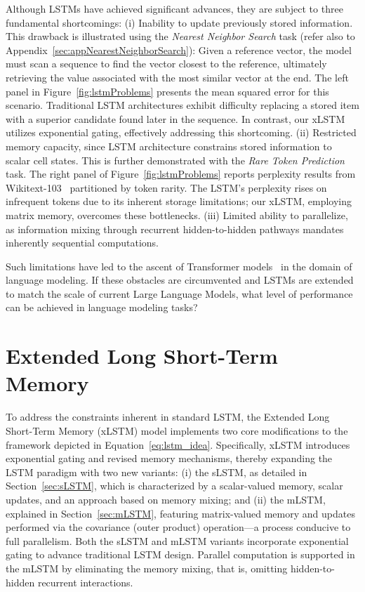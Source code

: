 Although LSTMs have achieved significant advances, they are subject to three fundamental shortcomings: (i) Inability to update previously stored information. This drawback is illustrated using the {\it Nearest Neighbor Search} task (refer also to Appendix~\ref{sec:appNearestNeighborSearch}): Given a reference vector, the model must scan a sequence to find the vector closest to the reference, ultimately retrieving the value associated with the most similar vector at the end. The left panel in Figure~\ref{fig:lstmProblems} presents the mean squared error for this scenario. Traditional LSTM architectures exhibit difficulty replacing a stored item with a superior candidate found later in the sequence. In contrast, our xLSTM utilizes exponential gating, effectively addressing this shortcoming. (ii) Restricted memory capacity, since LSTM architecture constrains stored information to scalar cell states. This is further demonstrated with the {\it Rare Token Prediction} task. The right panel of Figure~\ref{fig:lstmProblems} reports perplexity results from Wikitext-103~\citep{Merity:17} partitioned by token rarity. The LSTM's perplexity rises on infrequent tokens due to its inherent storage limitations; our xLSTM, employing matrix memory, overcomes these bottlenecks. (iii) Limited ability to parallelize, as information mixing through recurrent hidden-to-hidden pathways mandates inherently sequential computations.

Such limitations have led to the ascent of Transformer models~\citep{Vaswani:17} in the domain of language modeling. If these obstacles are circumvented and LSTMs are extended to match the scale of current Large Language Models, what level of performance can be achieved in language modeling tasks?

\section{Extended Long Short-Term Memory}
\label{sec:xLSTM}

To address the constraints inherent in standard LSTM, the Extended Long Short-Term Memory (xLSTM) model implements two core modifications to the framework depicted in Equation~\eqref{eq:lstm_idea}. Specifically, xLSTM introduces exponential gating and revised memory mechanisms, thereby expanding the LSTM paradigm with two new variants: (i) the sLSTM, as detailed in Section~\ref{sec:sLSTM}, which is characterized by a scalar-valued memory, scalar updates, and an approach based on memory mixing; and (ii) the mLSTM, explained in Section~\ref{sec:mLSTM}, featuring matrix-valued memory and updates performed via the covariance (outer product) operation—a process conducive to full parallelism. Both the sLSTM and mLSTM variants incorporate exponential gating to advance traditional LSTM design. Parallel computation is supported in the mLSTM by eliminating the memory mixing, that is, omitting hidden-to-hidden recurrent interactions. 

